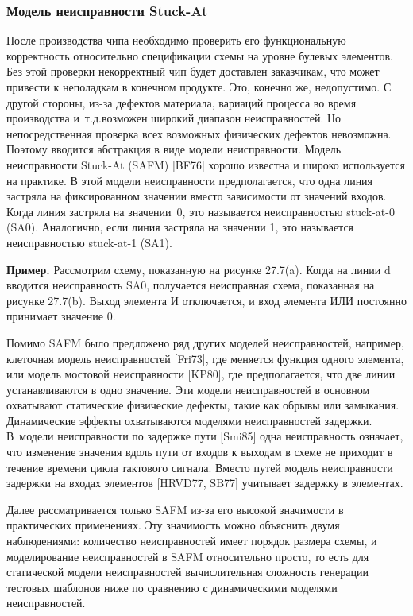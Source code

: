 \subsubsection{Модель неисправности Stuck-At}

После производства чипа необходимо проверить его функциональную корректность относительно спецификации схемы на уровне булевых элементов.
Без этой проверки некорректный чип будет доставлен заказчикам, что может привести к неполадкам в конечном продукте. Это, конечно же, недопустимо.
С другой стороны, из-за дефектов материала, вариаций процесса во время производства и~т.\@\:д.\@ возможен широкий диапазон неисправностей.
Но непосредственная проверка всех возможных физических дефектов невозможна.
Поэтому вводится абстракция в виде модели неисправности.
Модель неисправности Stuck-At (SAFM) [BF76] хорошо известна и широко используется на практике.
В этой модели неисправности предполагается, что одна линия застряла на фиксированном значении вместо зависимости от значений входов.
Когда линия застряла на значении~0, это называется неисправностью stuck-at-0 (SA0).
Аналогично, если линия застряла на значении 1, это называется неисправностью stuck-at-1 (SA1).

\textbf{Пример.}
Рассмотрим схему, показанную на рисунке 27.7(a). Когда на линии d вводится неисправность SA0, получается неисправная схема, показанная на рисунке 27.7(b). Выход элемента И отключается, и вход элемента ИЛИ постоянно принимает значение 0.

Помимо SAFM было предложено ряд других моделей неисправностей, например, клеточная модель неисправностей [Fri73], где меняется функция одного элемента, или модель мостовой неисправности [KP80], где предполагается, что две линии устанавливаются в одно значение.
Эти модели неисправностей в основном охватывают статические физические дефекты, такие как обрывы или замыкания.
Динамические эффекты охватываются моделями неисправностей задержки.
В~модели неисправности по задержке пути [Smi85] одна неисправность означает, что изменение значения вдоль пути от входов к выходам в схеме не приходит в течение времени цикла тактового сигнала.
Вместо путей модель неисправности задержки на входах элементов [HRVD77, SB77] учитывает задержку в элементах.

Далее рассматривается только SAFM из-за его высокой значимости в практических применениях.
Эту значимость можно объяснить двумя наблюдениями: количество неисправностей имеет порядок размера схемы, и моделирование неисправностей в SAFM относительно просто, то есть для статической модели неисправностей вычислительная сложность генерации тестовых шаблонов ниже по сравнению с динамическими моделями неисправностей.

